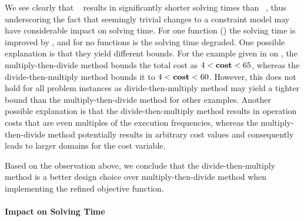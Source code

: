 We see clearly that ~
results in significantly shorter solving times than ~, thus underscoring the fact that seemingly
trivial changes to a \gls{constraint model} may have considerable impact on
solving time.
%
For one \gls{function} () the solving time is
improved by
\printSpeedup{%
  \NewOpCostFunVsOldPrePlusSolvingTimeSpeedupPrePlusSolvingTimeZeroCenteredSpeedupMax%
}, and for no \glspl{function} is the solving time degraded.
%
One possible explanation is that they yield different bounds.
%
For the example given in  on
, the \gls{multiply-then-divide method} bounds the
total cost as \mbox{$4 < \mVar{cost} < 65$}, whereas the
\gls{divide-then-multiply method} bounds it to \mbox{$4 < \mVar{cost} < 60$}.
%
However, this does not hold for all problem instances as
\gls{divide-then-multiply method} may yield a tighter bound than the
\gls{multiply-then-divide method} for other examples.
%
Another possible explanation is that the \gls{divide-then-multiply method}
results in \gls{operation} costs that are even multiples of the execution
frequencies, whereas the \gls{multiply-then-divide method} potentially results
in arbitrary cost values and consequently leads to larger \glspl{domain} for the
\gls{cost variable}.

Based on the observation above, we conclude that the \gls{divide-then-multiply
  method} is a better design choice over \gls{multiply-then-divide method} when
implementing the refined \gls{objective function}.


\paragraph{Impact on Solving Time}

